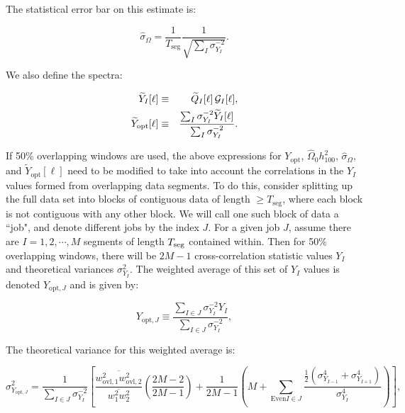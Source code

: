The statistical error bar on this estimate is:

\begin{equation}
\widehat \sigma_{\Omega} = \frac{1}{T_{\mathrm{seg}}}
\frac{1}{\sqrt{\sum_I \sigma_{Y_{I}}^{-2}}}.
\end{equation}

We also define the spectra:

\begin{eqnarray}
\widetilde Y_{I}[\ell] & \equiv & \widetilde Q_I[\ell]\,{\cal
	G}_{I}[\ell], \\
\widetilde Y_{\mathrm{opt}}[\ell] & \equiv & \frac{\sum_I
\sigma_{Y_{I}}^{-2} \widetilde Y_{I}[\ell]}{\sum_I \sigma_{Y_{I}}^{-2}}.
\end{eqnarray}

If 50\% overlapping windows are used, the above expressions for
$Y_{\mathrm{opt}}$, $\widehat \Omega_0 h_{100}^2$, $\widehat
\sigma_{\Omega}$, and $\widetilde Y_{\mathrm{opt}}[\ell]$ need to be
modified to take into account the correlations in the $Y_I$ values
formed from overlapping data segments. To do this, consider splitting up
the full data set into blocks of contiguous data of length $\ge
T_{\mathrm{seg}}$, where each block is not contiguous with any other
block. We will call one such block of data a ``job", and denote
different jobs by the index $J$. For a given job $J$, assume there are
$I=1, 2, \cdots, M$ segments of length $T_{\rm seg}$ contained within.
Then for 50\% overlapping windows, there will be $2M-1$
cross-correlation statistic values $Y_I$ and theoretical variances
$\sigma^2_{Y_I}$. The weighted average of this set of $Y_I$ values is
denoted $Y_{\mathrm{opt}, J}$ and is given by:

\begin{equation}
Y_{\mathrm{opt}, J} \equiv \frac{\sum_{I \in J}\sigma_{Y_{I}}^{-2}
Y_{I}}{\sum_{I \in J} \sigma_{Y_{I}}^{-2}},
\end{equation}

The theoretical variance for this weighted average is:

\begin{equation}
\label{e:theorvar_overlap}
\sigma_{Y_{\mathrm{opt}, J}}^2 = \frac{1}{\sum_{I \in J}
\sigma_{Y_{I}}^{-2}} \left[ \frac{\overline{w_{\mathrm{ovl}, 1}^2
w_{\mathrm{ovl}, 2}^2}}{\overline{w_1^2 w_2^2}} \left(\frac{2M-2}{2M-1}
\right) + \frac{1}{2M-1} \left( M + \sum_{\mathrm{Even} I \in J}
\frac{\frac{1}{2} (\sigma^4_{Y_{I-1}} +
\sigma^4_{Y_{I+1}})}{\sigma^4_{Y_I}} \right) \right],
\end{equation}

